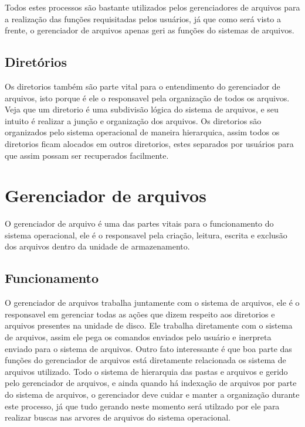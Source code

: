 \documentclass[12pt,a4paper,openany,oneside]{abntex2}
\begin{document}
Todos estes processos são bastante utilizados pelos gerenciadores de arquivos para a realização das funções requisitadas pelos usuários, já que como será visto a frente, o gerenciador de arquivos apenas geri as funções do sistemas de arquivos.

\subsection{Diretórios}

Os diretorios também são parte vital para o entendimento do gerenciador de arquivos, isto porque é ele o responsavel pela organização de todos os arquivos. Veja que um diretorio é uma subdivisão lógica do sistema de arquivos, e seu intuito é  realizar a junção e organização dos arquivos.
Os diretorios são organizados pelo sistema operacional de maneira hierarquica, assim todos os diretorios ficam alocados em outros diretorios, estes separados por usuários para que assim possam ser recuperados facilmente.

\section{Gerenciador de arquivos}

O gerenciador de arquivo é uma das partes vitais para o funcionamento do sistema operacional, ele é o responsavel pela criação, leitura, escrita e exclusão dos arquivos dentro da unidade de armazenamento.

\subsection{Funcionamento}

O gerenciador de arquivos trabalha juntamente com o sistema de arquivos, ele é o responsavel em gerenciar todas as ações que dizem respeito aos diretorios e arquivos presentes na unidade de disco. Ele trabalha diretamente com o sistema de arquivos, assim ele pega os comandos enviados pelo usuário e inerpreta enviado para o sistema de arquivos. Outro fato interessante é que boa parte das funções do gerenciador de arquivos está diretamente relacionada os sistema de arquivos utilizado.
Todo o sistema de hierarquia das pastas e arquivos e gerido pelo gerenciador de arquivos, e ainda quando há indexação de arquivos por parte do sistema de arquivos, o gerenciador deve cuidar e manter a organização durante este processo, já que tudo gerando neste momento será utilzado por ele para realizar buscas nas arvores de arquivos do sistema operacional.
\end{document}
